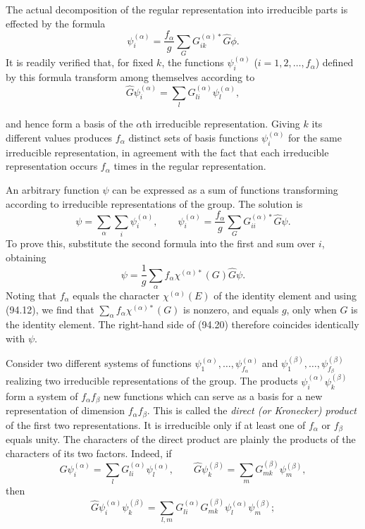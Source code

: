The actual decomposition of the regular representation into irreducible parts is effected by the formula
\begin{equation}
 \psi_i^{(\alpha)}=\frac{f_\alpha}{g}\sum_GG_{ik}^{(\alpha)*}\widehat G\phi.
 \tag{94.18}
\end{equation}
It is readily verified that, for fixed $k$, the functions $\psi_i^{(\alpha)}$ ($i=1,2,\ldots,f_\alpha$) defined by this formula transform among themselves according to
\[
 \widehat G\psi_i^{(\alpha)}=\sum_lG_{li}^{(\alpha)}\psi_l^{(\alpha)},
\]

and hence form a basis of the $\alpha$th irreducible representation. Giving $k$ its different values produces $f_\alpha$ distinct sets of basis functions $\psi_i^{(\alpha)}$ for the same irreducible representation, in agreement with the fact that each irreducible representation occurs $f_\alpha$ times in the regular representation.

An arbitrary function $\psi$ can be expressed as a sum of functions transforming according to irreducible representations of the group. The solution is
\begin{equation}
 \psi=\sum_\alpha\sum_i\psi_i^{(\alpha)},\qquad
 \psi_i^{(\alpha)}=\frac{f_\alpha}{g}\sum_GG_{ii}^{(\alpha)*}\widehat G\psi.
 \tag{94.19}
\end{equation}
To prove this, substitute the second formula into the first and sum over $i$, obtaining
\begin{equation}
 \psi=\frac1g\sum_\alpha f_\alpha\chi^{(\alpha)*}(G)\widehat G\psi.
 \tag{94.20}
\end{equation}
Noting that $f_\alpha$ equals the character $\chi^{(\alpha)}(E)$ of the identity element and using (94.12), we find that $\sum_\alpha f_\alpha\chi^{(\alpha)*}(G)$ is nonzero, and equals $g$, only when $G$ is the identity element. The right-hand side of (94.20) therefore coincides identically with $\psi$.

Consider two different systems of functions $\psi_1^{(\alpha)},\ldots,\psi_{f_\alpha}^{(\alpha)}$ and $\psi_1^{(\beta)},\ldots,\psi_{f_\beta}^{(\beta)}$ realizing two irreducible representations of the group. The products $\psi_i^{(\alpha)}\psi_k^{(\beta)}$ form a system of $f_\alpha f_\beta$ new functions which can serve as a basis for a new representation of dimension $f_\alpha f_\beta$. This is called the \emph{direct (or Kronecker) product} of the first two representations. It is irreducible only if at least one of $f_\alpha$ or $f_\beta$ equals unity. The characters of the direct product are plainly the products of the characters of its two factors. Indeed, if
\[
 \widehat G\psi_i^{(\alpha)}=\sum_lG_{li}^{(\alpha)}\psi_l^{(\alpha)},\qquad
 \widehat G\psi_k^{(\beta)}=\sum_mG_{mk}^{(\beta)}\psi_m^{(\beta)},
\]
then
\[
 \widehat G\psi_i^{(\alpha)}\psi_k^{(\beta)}=
 \sum_{l,m}G_{li}^{(\alpha)}G_{mk}^{(\beta)}\psi_l^{(\alpha)}\psi_m^{(\beta)};
\]

